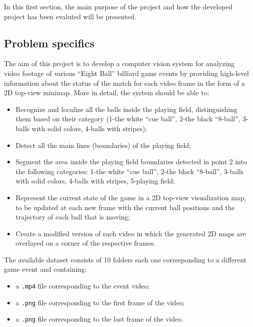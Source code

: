 In this first section, the main purpose of the project and how the developed project has been evaluted will be presented.


\subsection{Problem specifics}
The aim of this project is to develop a computer vision system for analyzing video footage of various “Eight Ball”
billiard game events by providing high-level information about the status of the match for each video frame in the form of a 
2D top-view minimap.
\newline
More in detail, the system should be able to:
\begin{itemize}
    \item Recognize and localize all the balls inside the playing field, distinguishing them based on their category (1-the
    white “cue ball”, 2-the black “8-ball”, 3-balls with solid colors, 4-balls with stripes);
    \item Detect all the main lines (boundaries) of the playing field;
    \item Segment the area inside the playing field boundaries detected in point 2 into the following categories: 1-the
    white “cue ball”, 2-the black “8-ball”, 3-balls with solid colors, 4-balls with stripes, 5-playing field;
    \item Represent the current state of the game in a 2D top-view visualization map, to be updated at each new frame
    with the current ball positions and the trajectory of each ball that is moving;
    \item Create a modified version of each video in which the generated 2D maps are 
    overlayed on a corner of the respective frames.
\end{itemize}

\begin{flushleft}
The available dataset consists of 10 folders each one corresponding to a different game event and containing:
\end{flushleft}
\begin{itemize}
    \item a \verb|.mp4| file corresponding to the event video;
    \item a \verb|.png| file corresponding to the first frame of the video;
    \item a \verb|.png| file corresponding to the last frame of the video.
\end{itemize}

